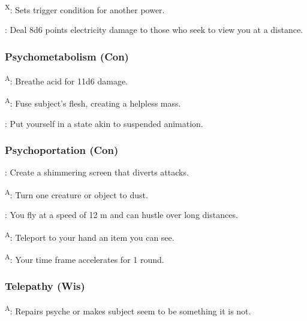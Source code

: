 \textsuperscript{X}: Sets trigger condition for another power.

: Deal 8d6 points electricity damage to those who seek to view you at a distance.






\subsubsection{Psychometabolism (Con)}

\textsuperscript{A}: Breathe acid for 11d6 damage.

\textsuperscript{A}: Fuse subject's flesh, creating a helpless mass.

: Put yourself in a state akin to suspended animation.


\subsubsection{Psychoportation (Con)}

: Create a shimmering screen that diverts attacks.

\textsuperscript{A}: Turn one creature or object to dust.

: You fly at a speed of 12 m and can hustle over long distances.

\textsuperscript{A}: Teleport to your hand an item you can see.

\textsuperscript{A}: Your time frame accelerates for 1 round.


\subsubsection{Telepathy (Wis)}

\textsuperscript{A}: Repairs psyche or makes subject seem to be something it is not.


